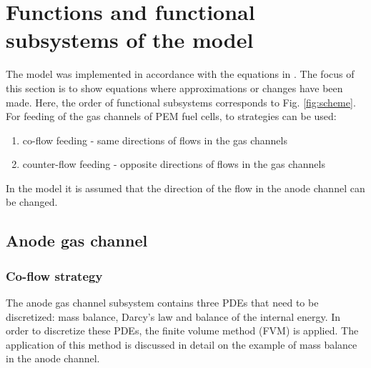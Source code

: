 \documentclass[pdftex,a4paper, 12pt]{article}
\begin{document}
\section{Functions and functional subsystems of the model}
\label{sec:fnc}
%
%
The model was implemented in accordance with the equations in \cite{Mangold2010}. The focus of this section is to show equations where approximations or changes have been made. Here, the order of functional subsystems corresponds to Fig. \ref{fig:scheme}. \\
%
For feeding of the gas channels of PEM fuel cells, to strategies can be used:
\begin{enumerate}
	\item co-flow feeding - same directions of flows in the gas channels
	\item counter-flow feeding - opposite directions of flows in the gas channels
\end{enumerate}
In the model it is assumed that the direction of the flow in the anode channel can be changed.
%
\subsection{Anode gas channel}
%
\subsubsection*{Co-flow strategy}
%
The anode gas channel subsystem contains three PDEs that need to be discretized: mass balance, Darcy's law and balance of the internal energy. In order to discretize these PDEs, the finite volume method (FVM) is applied. The application of this method is discussed in detail on the example of mass balance in the anode channel.
%
\end{document}
